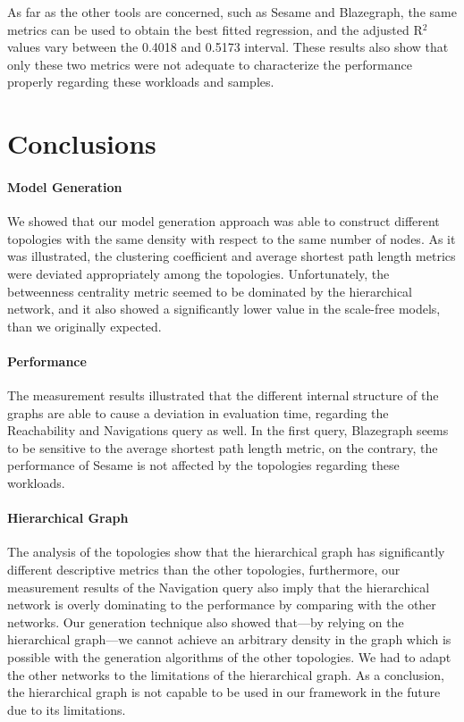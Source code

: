 As far as the other tools are concerned, such as Sesame and Blazegraph, the same metrics can be used to obtain the best fitted regression, and the adjusted R$^2$ values vary between the 0.4018 and 0.5173 interval. These results also show that only these two metrics were not adequate to characterize the performance properly regarding these workloads and samples.

\section{Conclusions}

\paragraph{Model Generation}
We showed that our model generation approach was able to construct different topologies with the same density with respect to the same number of nodes. As it was illustrated, the clustering coefficient and average shortest path length metrics were deviated appropriately among the topologies. Unfortunately, the betweenness centrality metric seemed to be dominated by the hierarchical network, and it also showed a significantly lower value in the scale-free models, than we originally expected. 

\paragraph{Performance}
The measurement results illustrated that the different internal structure of the graphs are able to cause a deviation in evaluation time, regarding the Reachability and Navigations query as well. In the first query, Blazegraph seems to be sensitive to the average shortest path length metric, on the contrary, the performance of Sesame is not affected by the topologies regarding these workloads.

\paragraph{Hierarchical Graph}

The analysis of the topologies show that the hierarchical graph has significantly different descriptive metrics than the other topologies, furthermore, our measurement results of the Navigation query also imply that the hierarchical network is overly dominating to the performance by comparing with the other networks. Our generation technique also showed that---by relying on the hierarchical graph---we cannot achieve an arbitrary density in the graph which is possible with the generation algorithms of the other topologies. We had to adapt the other networks to the limitations of the hierarchical graph. As a conclusion, the hierarchical graph is not capable to be used in our framework in the future due to its limitations.

